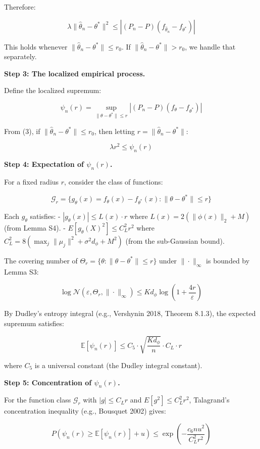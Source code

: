 \documentclass[
  12pt,
]{article}
\begin{document}
Therefore:

\[\lambda \|\hat{\theta}_n - \theta^*\|^2 \leq |(P_n-P)(f_{\hat{\theta}_n} - f_{\theta^*})| \tag{3}\]

This holds whenever \(\|\hat{\theta}_n - \theta^*\| \leq r_0\). If
\(\|\hat{\theta}_n - \theta^*\| > r_0\), we handle that separately.

\textbf{Step 3: The localized empirical process.}

Define the localized supremum:

\[\psi_n(r) = \sup_{\|\theta - \theta^*\| \leq r} |(P_n-P)(f_\theta - f_{\theta^*})|\]

From (3), if \(\|\hat{\theta}_n - \theta^*\| \leq r_0\), then letting
\(r = \|\hat{\theta}_n - \theta^*\|\):

\[\lambda r^2 \leq \psi_n(r) \tag{4}\]

\textbf{Step 4: Expectation of \(\psi_n(r)\).}

For a fixed radius \(r\), consider the class of functions:

\[\mathcal{G}_r = \{g_\theta(x) = f_\theta(x) - f_{\theta^*}(x) : \|\theta - \theta^*\| \leq r\}\]

Each \(g_\theta\) satisfies: - \(|g_\theta(x)| \leq L(x) \cdot r\) where
\(L(x) = 2(\|\phi(x)\|_2 + M)\) (from Lemma S4). -
\(E[g_\theta(X)^2] \leq C_L^2 r^2\) where
\(C_L^2 = 8(\max_j \|\mu_j\|^2 + \sigma^2 d_\phi + M^2)\) (from the
sub-Gaussian bound).

The covering number of
\(\Theta_r = \{\theta : \|\theta - \theta^*\| \leq r\}\) under
\(\|\cdot\|_\infty\) is bounded by Lemma S3:

\[\log \mathcal{N}(\varepsilon, \Theta_r, \|\cdot\|_\infty) \leq K d_\phi \log\left(1 + \frac{4r}{\varepsilon}\right)\]

By Dudley's entropy integral (e.g., Vershynin 2018, Theorem 8.1.3), the
expected supremum satisfies:

\[\mathbb{E}[\psi_n(r)] \leq C_5 \cdot \sqrt{\frac{K d_\phi}{n}} \cdot C_L \cdot r \tag{5}\]

where \(C_5\) is a universal constant (the Dudley integral constant).

\textbf{Step 5: Concentration of \(\psi_n(r)\).}

For the function class \(\mathcal{G}_r\) with \(|g| \leq C_L r\) and
\(E[g^2] \leq C_L^2 r^2\), Talagrand's concentration inequality (e.g.,
Bousquet 2002) gives:

\[P\left(\psi_n(r) \geq \mathbb{E}[\psi_n(r)] + u\right) \leq \exp\left(-\frac{c_6 n u^2}{C_L^2 r^2}\right) \tag{6}\]
\end{document}
